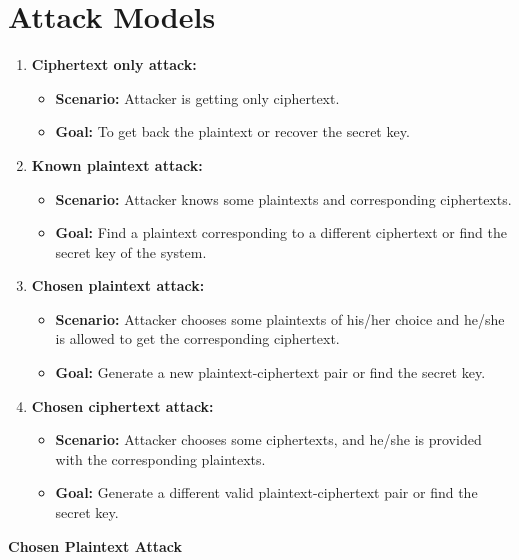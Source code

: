 \documentclass[11pt]{article}
\begin{document}
\section*{Attack Models}
\begin{enumerate}[label=\arabic*)]
    \item \textbf{Ciphertext only attack:}
    \begin{itemize}[label=--,leftmargin=*]
        \item \textbf{Scenario:} Attacker is getting only ciphertext.
        \item \textbf{Goal:} To get back the plaintext or recover the secret key.
    \end{itemize}
    
    \item \textbf{Known plaintext attack:}
    \begin{itemize}[label=--,leftmargin=*]
        \item \textbf{Scenario:} Attacker knows some plaintexts and corresponding ciphertexts.
        \item \textbf{Goal:} Find a plaintext corresponding to a different ciphertext or find the secret key of the system.
    \end{itemize}
    
    \item \textbf{Chosen plaintext attack:}
    \begin{itemize}[label=--,leftmargin=*]
        \item \textbf{Scenario:} Attacker chooses some plaintexts of his/her choice and he/she is allowed to get the corresponding ciphertext.
        \item \textbf{Goal:} Generate a new plaintext-ciphertext pair or find the secret key.
    \end{itemize}
    
    \item \textbf{Chosen ciphertext attack:}
    \begin{itemize}[label=--,leftmargin=*]
        \item \textbf{Scenario:} Attacker chooses some ciphertexts, and he/she is provided with the corresponding plaintexts.
        \item \textbf{Goal:} Generate a different valid plaintext-ciphertext pair or find the secret key.
    \end{itemize}
\end{enumerate}

\textbf{Chosen Plaintext Attack}
\end{document}
